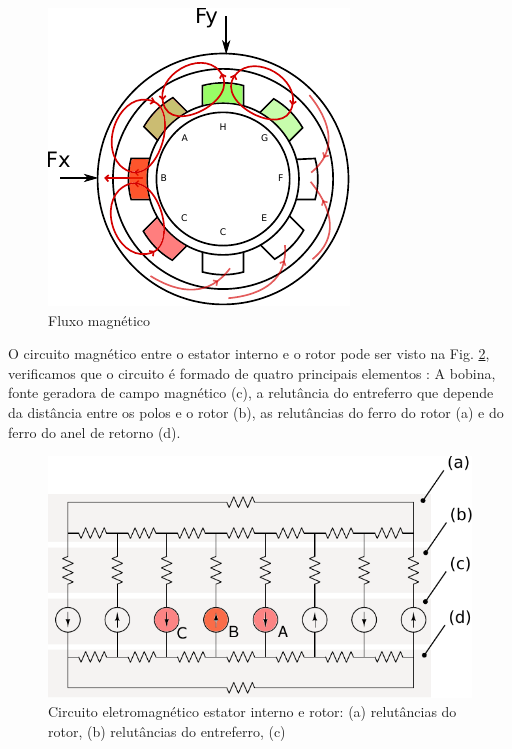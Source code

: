  \begin{figure}[ht!]
 	\centering
 	\includegraphics[width=0.7\linewidth]{./Figs/modelo_mancal_estator_interno_fluxo2}
 	\caption{Fluxo magnético}
 	\label{fig:modelo:mancal:estator:interno:fluxo2}
 \end{figure}

O circuito magnético entre o estator interno e o rotor pode ser visto na Fig. \ref{fig:modelo:circuito:ativo:explicativo}, verificamos que o circuito é formado de quatro principais elementos : A bobina, fonte geradora de campo magnético (c), a relutância do entreferro que depende da distância entre os polos e o rotor (b), as relutâncias do ferro do rotor (a) e do ferro do anel de retorno (d).

\begin{figure}[ht!]
\centering
\includegraphics[width=0.7\linewidth]{./Figs/modelo_circuito_ativo_explicativo}
\caption[Circuito eletromagnético estator interno e rotor]{Circuito eletromagnético estator interno e rotor: (a) relutâncias do rotor, (b) relutâncias do entreferro, (c) }
\label{fig:modelo:circuito:ativo:explicativo}
\end{figure}

